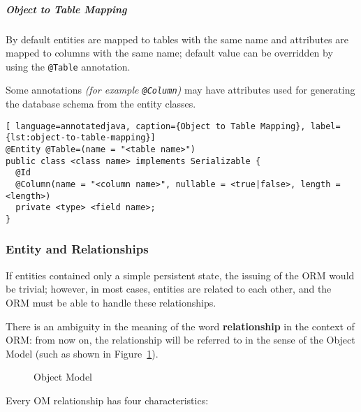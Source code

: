 \documentclass[english]{article}
\begin{document}
\subparagraph*{Object to Table Mapping}
By default entities are mapped to tables with the same name and attributes are mapped to columns with the same name;
default value can be overridden by using the \texttt{@Table} annotation.

Some annotations \textit{(for example \texttt{@Column})} may have attributes used for generating the database schema from the entity classes.

\begin{lstlisting}[ language=annotatedjava, caption={Object to Table Mapping}, label={lst:object-to-table-mapping}]
@Entity @Table=(name = "<table name>")
public class <class name> implements Serializable {
  @Id
  @Column(name = "<column name>", nullable = <true|false>, length = <length>)
  private <type> <field name>;
}
\end{lstlisting}

\subsubsection{Entity and Relationships}

If entities contained only a simple persistent state, the issuing of the ORM would be trivial;
however, in most cases, entities are related to each other, and the ORM must be able to handle these relationships.

There is an ambiguity in the meaning of the word \textbf{relationship} in the context of ORM:
from now on, the relationship will be referred to in the sense of the Object Model (such as shown in Figure~\ref{fig:object-model}).

\begin{figure}[htbp]
  \centering
  \bigskip
  \bigskip
  \caption{Object Model}
  \label{fig:object-model}
\end{figure}

Every OM relationship has four characteristics:
\end{document}

